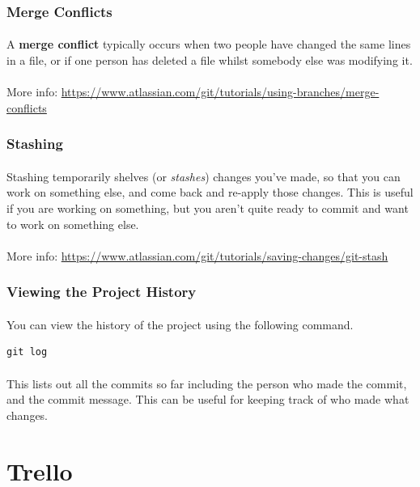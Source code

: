 \documentclass[11pt]{article}
\begin{document}
\subsubsection{Merge Conflicts}
\paragraph{}
A \textbf{merge conflict} typically occurs when two people have changed the same lines in a file, or if one person has deleted a file whilst somebody else was modifying it.
\paragraph{}
More info: \url{https://www.atlassian.com/git/tutorials/using-branches/merge-conflicts}
\subsubsection{Stashing}
\paragraph{}
Stashing temporarily shelves (or \textit{stashes}) changes you've made, so that you can work on something else, and come back and re-apply those changes. This is useful if you are working on something, but you aren't quite ready to commit and want to work on something else.
\paragraph{}
More info: \url{https://www.atlassian.com/git/tutorials/saving-changes/git-stash}
\subsubsection{Viewing the Project History}
\paragraph{}
You can view the history of the project using the following command.
\begin{lstlisting}
git log
\end{lstlisting}
\paragraph{}
This lists out all the commits so far including the person who made the commit, and the commit message. This can be useful for keeping track of who made what changes.
\section{Trello}
\end{document}

